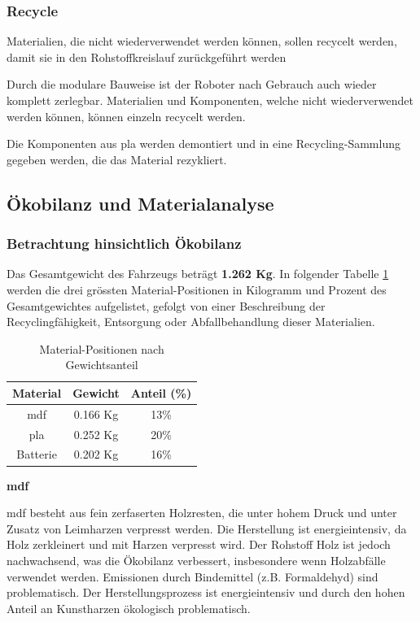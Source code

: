 \subsubsection{Recycle}

Materialien, die nicht wiederverwendet werden können, sollen
recycelt werden, damit sie in den Rohstoffkreislauf zurückgeführt werden

Durch die modulare Bauweise ist der Roboter nach Gebrauch auch wieder komplett zerlegbar. Materialien und Komponenten, welche nicht wiederverwendet werden können, können einzeln recycelt werden.

Die Komponenten aus \acrshort{pla} werden demontiert und in eine Recycling-Sammlung gegeben werden, die das Material rezykliert.


\subsection{Ökobilanz und Materialanalyse}

\subsubsection{Betrachtung hinsichtlich Ökobilanz}
Das Gesamtgewicht des Fahrzeugs beträgt \textbf{1.262 Kg}. In folgender Tabelle \ref{tab:kritische-mat} werden die drei grössten Material-Positionen in Kilogramm und Prozent des Gesamtgewichtes aufgelistet, gefolgt von einer Beschreibung der Recyclingfähigkeit, Entsorgung oder Abfallbehandlung dieser Materialien.

\begin{table}[H]
    \centering
    \begin{tabular}{|c|c|c|}
    \hline
    \textbf{Material} & \textbf{Gewicht}  & \textbf{Anteil} (\%)\\
    \hline
    \acrshort{mdf} & 0.166 Kg & 13\% \\
    \hline
    \acrshort{pla} & 0.252 Kg & 20\% \\
    \hline
    Batterie & 0.202 Kg & 16\%   \\
    \hline
    \end{tabular}
    \caption{Material-Positionen nach Gewichtsanteil}
    \label{tab:kritische-mat}
\end{table}


\textbf{\acrfull{mdf}}

\acrshort{mdf} besteht aus fein zerfaserten Holzresten, die unter hohem Druck und unter Zusatz von Leimharzen verpresst werden. Die Herstellung ist energieintensiv, da Holz zerkleinert und mit Harzen verpresst wird. Der Rohstoff Holz ist jedoch nachwachsend, was die Ökobilanz verbessert, insbesondere wenn Holzabfälle verwendet werden. Emissionen durch Bindemittel (z.B. Formaldehyd) sind problematisch.\cite{support-2024}
Der Herstellungsprozess ist energieintensiv und durch den hohen Anteil an Kunstharzen ökologisch problematisch.

